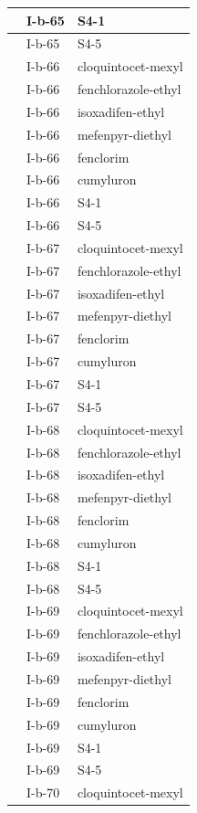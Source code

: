 \documentclass[11pt,a4paper]{article}
\begin{document}
\begin{table}[h]
\begin{tabular}{|l|l|l|}
 & I-b-65 & S4-1 \\ \hline
 & I-b-65 & S4-5 \\ \hline
 & I-b-66 & cloquintocet-mexyl \\ \hline
 & I-b-66 & fenchlorazole-ethyl \\ \hline
 & I-b-66 & isoxadifen-ethyl \\ \hline
 & I-b-66 & mefenpyr-diethyl \\ \hline
 & I-b-66 & fenclorim \\ \hline
 & I-b-66 & cumyluron \\ \hline
 & I-b-66 & S4-1 \\ \hline
 & I-b-66 & S4-5 \\ \hline
 & I-b-67 & cloquintocet-mexyl \\ \hline
 & I-b-67 & fenchlorazole-ethyl \\ \hline
 & I-b-67 & isoxadifen-ethyl \\ \hline
 & I-b-67 & mefenpyr-diethyl \\ \hline
 & I-b-67 & fenclorim \\ \hline
 & I-b-67 & cumyluron \\ \hline
 & I-b-67 & S4-1 \\ \hline
 & I-b-67 & S4-5 \\ \hline
 & I-b-68 & cloquintocet-mexyl \\ \hline
 & I-b-68 & fenchlorazole-ethyl \\ \hline
 & I-b-68 & isoxadifen-ethyl \\ \hline
 & I-b-68 & mefenpyr-diethyl \\ \hline
 & I-b-68 & fenclorim \\ \hline
 & I-b-68 & cumyluron \\ \hline
 & I-b-68 & S4-1 \\ \hline
 & I-b-68 & S4-5 \\ \hline
 & I-b-69 & cloquintocet-mexyl \\ \hline
 & I-b-69 & fenchlorazole-ethyl \\ \hline
 & I-b-69 & isoxadifen-ethyl \\ \hline
 & I-b-69 & mefenpyr-diethyl \\ \hline
 & I-b-69 & fenclorim \\ \hline
 & I-b-69 & cumyluron \\ \hline
 & I-b-69 & S4-1 \\ \hline
 & I-b-69 & S4-5 \\ \hline
 & I-b-70 & cloquintocet-mexyl \\ \hline

\end{tabular}
\end{table}
\end{document}

